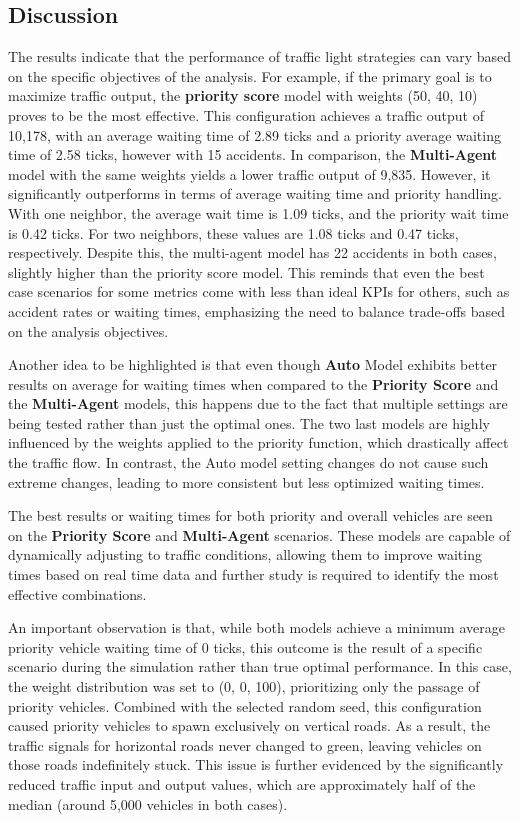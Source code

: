 \documentclass[sigconf]{acmart}
\begin{document}
\subsection{Discussion}

The results indicate that the performance of traffic light strategies can vary based on the specific objectives of the analysis. For example, if the primary goal is to maximize traffic output, the \textbf{priority score} model with weights (50, 40, 10) proves to be the most effective. This configuration achieves a traffic output of 10,178, with an average waiting time of 2.89 ticks and a priority average waiting time of 2.58 ticks, however with 15 accidents. In comparison, the \textbf{Multi-Agent} model with the same weights yields a lower traffic output of 9,835. However, it significantly outperforms in terms of average waiting time and priority handling. With one neighbor, the average wait time is 1.09 ticks, and the priority wait time is 0.42 ticks. For two neighbors, these values are 1.08 ticks and 0.47 ticks, respectively. Despite this, the multi-agent model has 22 accidents in both cases, slightly higher than the priority score model. This reminds that even the best case scenarios for some metrics come with less than ideal KPIs for others, such as accident rates or waiting times, emphasizing the need to balance trade-offs based on the analysis objectives.

Another idea to be highlighted is that even though \textbf{Auto} Model exhibits better results on average for waiting times when compared to the \textbf{Priority Score} and the \textbf{Multi-Agent} models, this happens due to the fact that multiple settings are being tested rather than just the optimal ones. The two last models are highly influenced by the weights applied to the priority function, which drastically affect the traffic flow. In contrast, the Auto model setting changes do not cause such extreme changes, leading to more consistent but less optimized waiting times.

The best results or waiting times for both priority and overall vehicles are seen on the \textbf{Priority Score} and \textbf{Multi-Agent} scenarios. These models are capable of dynamically adjusting to traffic conditions, allowing them to improve waiting times based on real time data and further study is required to identify the most effective combinations. 

An important observation is that, while both models achieve a minimum average priority vehicle waiting time of 0 ticks, this outcome is the result of a specific scenario during the simulation rather than true optimal performance. In this case, the weight distribution was set to (0, 0, 100), prioritizing only the passage of priority vehicles. Combined with the selected random seed, this configuration caused priority vehicles to spawn exclusively on vertical roads. As a result, the traffic signals for horizontal roads never changed to green, leaving vehicles on those roads indefinitely stuck. This issue is further evidenced by the significantly reduced traffic input and output values, which are approximately half of the median (around 5,000 vehicles in both cases).
\end{document}
